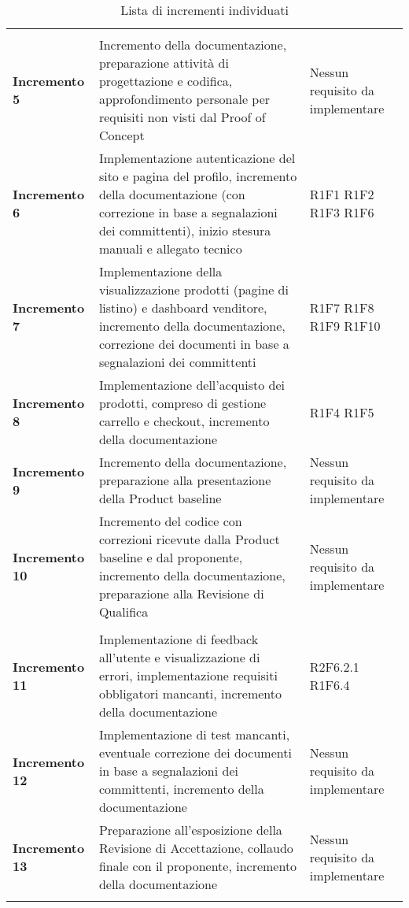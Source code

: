 {\begin{longtable}{C{3cm} C{8cm} C{3cm} }
\\
\textbf{Incremento 5} & Incremento della documentazione, preparazione attività di progettazione e codifica, approfondimento personale per requisiti non visti dal Proof of Concept & Nessun requisito da implementare \\
\textbf{Incremento 6} & Implementazione autenticazione del sito e pagina del profilo, incremento della documentazione (con correzione in base a segnalazioni dei committenti), inizio stesura manuali e allegato tecnico & R1F1 \newline R1F2 \newline R1F3 \newline R1F6 \\
\textbf{Incremento 7} & Implementazione della visualizzazione prodotti (pagine di listino) e dashboard venditore, incremento della documentazione, correzione dei documenti in base a segnalazioni dei committenti & R1F7 \newline R1F8 \newline R1F9 \newline R1F10 \\
\textbf{Incremento 8} & Implementazione dell'acquisto dei prodotti, compreso di gestione carrello e checkout, incremento della documentazione & R1F4 \newline R1F5\\
\textbf{Incremento 9} & Incremento della documentazione, preparazione alla presentazione della Product baseline & Nessun requisito da implementare \\
\textbf{Incremento 10} & Incremento del codice con correzioni ricevute dalla Product baseline e dal proponente, incremento della documentazione, preparazione alla Revisione di Qualifica & Nessun requisito da implementare \\

\\
\textbf{Incremento 11} & Implementazione di feedback all'utente e visualizzazione di errori, implementazione requisiti obbligatori mancanti, incremento della documentazione & R2F6.2.1 \newline R1F6.4 \\
\textbf{Incremento 12} & Implementazione di test mancanti, eventuale correzione dei documenti in base a segnalazioni dei committenti, incremento della documentazione & Nessun requisito da implementare \\
\textbf{Incremento 13} & Preparazione all'esposizione della Revisione di Accettazione, collaudo finale con il proponente, incremento della documentazione & Nessun requisito da implementare \\



\caption{Lista di incrementi individuati}

\end{longtable}
}
